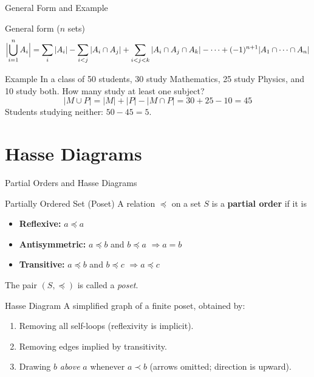 \documentclass{beamer}
\begin{document}
\begin{frame}{General Form and Example}
  \begin{block}{General form ($n$ sets)}
    \[
      \Bigl| \bigcup_{i=1}^{n} A_i \Bigr|
      = \sum_{i} |A_i|
      - \sum_{i<j} |A_i \cap A_j|
      + \sum_{i<j<k} |A_i \cap A_j \cap A_k|
      - \cdots
      + (-1)^{n+1} |A_1 \cap \cdots \cap A_n|
    \]
  \end{block}
  \pause
  \begin{exampleblock}{Example}
    In a class of 50 students, 30 study Mathematics, 25 study Physics,
    and 10 study both. How many study at least one subject?
    \[
      |M \cup P| = |M| + |P| - |M \cap P| = 30 + 25 - 10 = 45
    \]
    Students studying neither: $50 - 45 = 5$.
  \end{exampleblock}
\end{frame}

\section{Hasse Diagrams}
\begin{frame}{Partial Orders and Hasse Diagrams}
  \begin{block}{Partially Ordered Set (Poset)}
    A relation $\preceq$ on a set $S$ is a \textbf{partial order} if it
    is
    \begin{itemize}
      \item \textbf{Reflexive:} $a \preceq a$
      \item \textbf{Antisymmetric:} $a \preceq b$ and $b \preceq a$
            $\Rightarrow a = b$
      \item \textbf{Transitive:} $a \preceq b$ and $b \preceq c$
            $\Rightarrow a \preceq c$
    \end{itemize}
    The pair $(S, \preceq)$ is called a \emph{poset}.
  \end{block}
  \pause
  \begin{block}{Hasse Diagram}
    A simplified graph of a finite poset, obtained by:
    \begin{enumerate}
      \item Removing all self-loops (reflexivity is implicit).
      \item Removing edges implied by transitivity.
      \item Drawing $b$ \emph{above} $a$ whenever $a \prec b$
            (arrows omitted; direction is upward).
    \end{enumerate}
  \end{block}
\end{frame}
\end{document}
